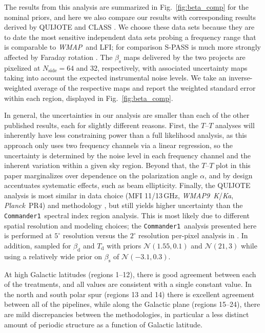 \documentclass[twocolumn]{../../common/aa}
\def\WMAP{\emph{WMAP}}
\def\WMAPnine{\emph{WMAP9}}
\def\Planck{\emph{Planck}}
\def\commanderone{\texttt{Commander1}}
\newcommand{\K}[0]{\textit K}
\newcommand{\Ka}[0]{\textit{Ka}}
\begin{document}
The results from this analysis are summarized in Fig.~\ref{fig:beta_comp} for the nominal priors, and here we also compare our results with corresponding results derived by QUIJOTE \citep{QUIJOTE_VIII} and CLASS \citep{eimer2023}. We choose these data sets because they are to date the most sensitive independent data sets probing a frequency range that is comparable to \WMAP\ and LFI; for comparison S-PASS is much more strongly affected by Faraday rotation \citep{krachmalnicoff2018,fuskeland:2019}. The $\beta_\mathrm s$ maps delivered by the two projects are pixelized at $N_\mathrm{side}=64$ and 32, respectively, with associated uncertainty maps taking into account the expected instrumental noise levels. We take an inverse-weighted average of the respective maps and report the weighted standard error within each region, displayed in Fig.~\ref{fig:beta_comp}. 

In general, the uncertainties in our analysis are smaller than each of the other published results, each for slightly different reasons. First, the $T$--$T$ analyses will inherently have less constraining power than a full likelihood analysis, as this approach only uses two frequency channels via a linear regression, so the uncertainty is determined by the noise level in each frequency channel and the inherent variation within a given sky region. Beyond that, the $T$--$T$ plot in this paper marginalizes over dependence on the polarization angle $\alpha$, and by design accentuates systematic effects, such as beam ellipticity. Finally, the QUIJOTE analysis is most similar in data choice (MFI 11/13\,GHz, \WMAPnine\ \K/\Ka, \Planck\ PR4) and methodology \citep[\texttt{B-SeCRET};][]{b-secret}, but still yields higher uncertainty than the \commanderone\ spectral index region analysis. This is most likely due to different spatial resolution and modeling choices; the \commanderone\ analysis presented here is performed at $5^\circ$ resolution versus the $2^\circ$ resolution per-pixel analysis in \citet{QUIJOTE_VIII}. In addition, \citet{QUIJOTE_VIII} sampled for $\beta_\mathrm d$ and $T_\mathrm{d}$ with priors $\mathcal N(1.55,0.1)$ and $\mathcal N(21,3)$ while using a relatively wide prior on $\beta_\mathrm s$ of $\mathcal N(-3.1, 0.3)$.

At high Galactic latitudes (regions 1--12), there is good agreement between each of the treatments, and all values are consistent with a single constant value. 
In the north and south polar spur (regions 13 and 14) there is excellent agreement between all of the pipelines, while along  the Galactic plane (regions 15--24), there are mild discrepancies between the methodologies, in particular a less distinct amount of periodic structure as a function of Galactic latitude.
\end{document}
